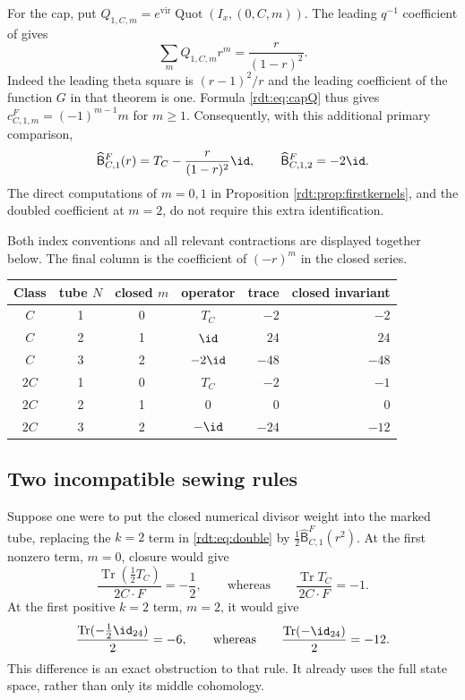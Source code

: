 For the cap, put
$Q_{1,C,m}=e^{\mathrm{vir}}\operatorname{Quot}(I_x,(0,C,m))$. The leading
$q^{-1}$ coefficient of \cite[Theorem 1.2]{OberdieckMC} gives
\[
 \sum_m Q_{1,C,m}r^m=\frac{r}{(1-r)^2}.
\]
Indeed the leading theta square is $(r-1)^2/r$ and the leading
coefficient of the function $G$ in that theorem is one. Formula
\eqref{rdt:eq:capQ} thus gives $c^F_{C,1,m}=(-1)^{m-1}m$ for
$m\ge1$. Consequently, with this additional primary comparison,
\begin{equation}\label{rdt:eq:fullC}
 \widehat{\mathsf B}^F_{C,1}(r)=T_C-\frac{r}{(1-r)^2}\id,
 \qquad \widehat{\mathsf B}^F_{C,1,2}=-2\id.
\end{equation}
The direct computations of $m=0,1$ in Proposition
\ref{rdt:prop:firstkernels}, and the doubled coefficient at $m=2$,
do not require this extra identification.

Both index conventions and all relevant contractions are displayed
together below. The final column is the coefficient of $(-r)^m$
in the closed series.
\begin{center}
\begin{tabular}{ccccrr}
\toprule
Class & tube $N$ & closed $m$ & operator & trace & closed invariant\\
\midrule
$C$  & 1 & 0 & $T_C$ & $-2$ & $-2$\\
$C$  & 2 & 1 & $\id$ & $24$ & $24$\\
$C$  & 3 & 2 & $-2\id$ & $-48$ & $-48$\\
$2C$ & 1 & 0 & $T_C$ & $-2$ & $-1$\\
$2C$ & 2 & 1 & $0$ & $0$ & $0$\\
$2C$ & 3 & 2 & $-\id$ & $-24$ & $-12$\\
\bottomrule
\end{tabular}
\end{center}

\subsection{Two incompatible sewing rules}

Suppose one were to put the closed numerical divisor weight into the
marked tube, replacing the $k=2$ term in
\eqref{rdt:eq:double} by $\tfrac12\widehat{\mathsf B}^F_{C,1}(r^2)$.
At the first nonzero term, $m=0$, closure would give
\[
 \frac{\operatorname{Tr}(\tfrac12T_C)}{2C\cdot F}=-\frac12,
 \qquad\text{whereas}\qquad
 \frac{\operatorname{Tr} T_C}{2C\cdot F}=-1.
\]
At the first positive $k=2$ term, $m=2$, it would give
\begin{equation}\label{rdt:eq:badweight}
 \frac{\operatorname{Tr}(-\tfrac12\id_{24})}{2}=-6,
 \qquad\text{whereas}\qquad
 \frac{\operatorname{Tr}(-\id_{24})}{2}=-12.
\end{equation}
This difference is an exact obstruction to that rule. It already
uses the full state space, rather than only its middle cohomology.

